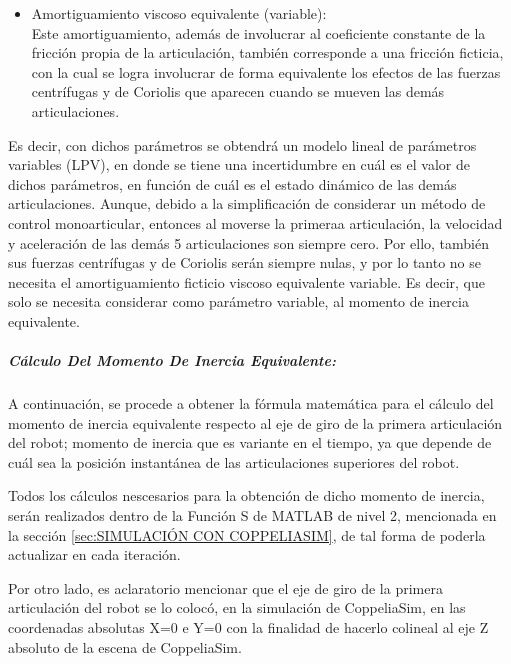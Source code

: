 \documentclass{article}
\begin{document}
\begin{sloppypar}
\begin{itemize}
    \item Amortiguamiento viscoso equivalente (variable):
    \\ Este amortiguamiento, además de involucrar al coeficiente constante de la fricción  propia de la articulación, también corresponde a una fricción ficticia, con la cual se logra involucrar de forma equivalente los efectos de las fuerzas centrífugas y de Coriolis que aparecen cuando se mueven las demás articulaciones.
\end{itemize}
Es decir, con dichos parámetros se obtendrá un modelo lineal de parámetros variables (LPV), en donde se tiene una incertidumbre en cuál es el valor de dichos parámetros, en función de cuál es el estado dinámico de las demás articulaciones.
Aunque, debido a la simplificación de considerar un método de control monoarticular, entonces al moverse la primeraa articulación, la velocidad y aceleración de las demás 5 articulaciones son siempre cero. Por ello, también sus fuerzas centrífugas y de Coriolis serán siempre nulas, y por lo tanto no se necesita el amortiguamiento ficticio viscoso equivalente variable. Es decir, que solo se necesita considerar como parámetro variable, al momento de inercia equivalente.

\hfill

\subparagraph{Cálculo Del Momento De Inercia Equivalente:}
\label{sec:Cálculo Del Momento De Inercia Equivalente:}

\hfill

\hfill

A continuación, se procede a obtener la fórmula matemática para el cálculo del momento de inercia equivalente respecto al eje de giro de la primera articulación del robot; momento de inercia que es variante en el tiempo, ya que depende de cuál sea la posición instantánea de las articulaciones superiores del robot.

Todos los cálculos nescesarios para la obtención de dicho momento de inercia, serán realizados dentro de la Función S de MATLAB de nivel 2, mencionada en la sección \ref{sec:SIMULACIÓN CON COPPELIASIM}, de tal forma de poderla actualizar en cada iteración.

Por otro lado, es aclaratorio mencionar que el eje de giro de la primera articulación del robot se lo colocó, en la simulación de CoppeliaSim, en las coordenadas absolutas X=0 e Y=0 con la finalidad de hacerlo colineal al eje Z absoluto de la escena de CoppeliaSim.


\end{sloppypar}
\end{document}
